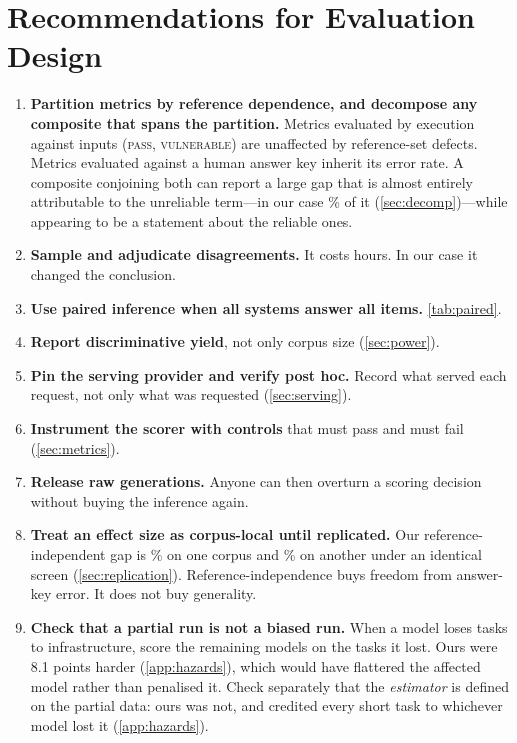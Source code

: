 \documentclass[11pt]{article}
\newcommand{\pass}{\textsc{pass}}
\newcommand{\vuln}{\textsc{vulnerable}}
\begin{document}
\section{Recommendations for Evaluation Design}

\begin{enumerate}
\item \textbf{Partition metrics by reference dependence, and decompose any
composite that spans the partition.} Metrics evaluated by execution against
inputs (\pass{}, \vuln{}) are unaffected by reference-set defects. Metrics
evaluated against a human answer key inherit its error rate. A composite
conjoining both can report a large gap that is almost entirely attributable to
the unreliable term---in our case \equivshare{}\% of it (\cref{sec:decomp})---while
appearing to be a statement about the reliable ones.

\item \textbf{Sample and adjudicate disagreements.} It costs hours. In our
case it changed the conclusion.

\item \textbf{Use paired inference when all systems answer all items.}
\cref{tab:paired}.

\item \textbf{Report discriminative yield}, not only corpus size
(\cref{sec:power}).

\item \textbf{Pin the serving provider and verify post hoc.} Record what
served each request, not only what was requested (\cref{sec:serving}).

\item \textbf{Instrument the scorer with controls} that must pass and must
fail (\cref{sec:metrics}).

\item \textbf{Release raw generations.} Anyone can then overturn a scoring
decision without buying the inference again.

\item \textbf{Treat an effect size as corpus-local until replicated.} Our
reference-independent gap is \vulngivencorrect{}\% on one corpus and \srvulngivencorrect{}\% on another under
an identical screen (\cref{sec:replication}). Reference-independence buys
freedom from answer-key error. It does not buy generality.

\item \textbf{Check that a partial run is not a biased run.} When a model
loses tasks to infrastructure, score the remaining models on the tasks it
lost. Ours were 8.1 points harder (\cref{app:hazards}), which would have
flattered the affected model rather than penalised it. Check separately that
the \emph{estimator} is defined on the partial data: ours was not, and
credited every short task to whichever model lost it (\cref{app:hazards}).


\end{enumerate}
\end{document}
